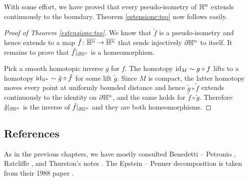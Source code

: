 With some effort, we have proved that every pseudo-isometry of $\mathbb{H}^n$ extends continuously to the boundary. Theorem \ref{estensione:teo} now follows easily.

\begin{proof}[Proof of Theorem \ref{estensione:teo}]
We know that $\tilde f$ is a pseudo-isometry and hence extends to a map $\tilde f \colon \overline {\mathbb{H}^n} \to \overline{\mathbb{H}^n}$ that sends injectively $\partial \mathbb{H}^n$ to itself. It remains to prove that $\tilde f|_{\partial \mathbb{H}^n}$ is a homeomorphism.

Pick a smooth homotopic inverse $g$ for $f$. The homotopy ${\rm id}_M \sim g \circ f$ lifts to a homotopy ${\rm id}_{\mathbb{H}^n}\sim\tilde g\circ \tilde f$ for some lift $\tilde g$. Since $M$ is compact, the latter homotopy moves every point at uniformly bounded distance and hence $\tilde g\circ \tilde f$ extends continuously to the identity on $\partial \mathbb{H}^n$, and the same holds for $\tilde f\circ \tilde g$. Therefore $\tilde g|_{\partial \mathbb{H}^n}$ is the inverse of $\tilde f|_{\partial \mathbb{H}^n}$ and they are both homeomorphisms.
\end{proof}

\subsection{References}
As in the previous chapters, we have mostly consulted Benedetti -- Petronio \cite{BP}, Ratcliffe \cite{R}, and Thurston's notes \cite{Th}. The Epstein -- Penner decomposition is taken from their 1988 paper \cite{EP}. 

